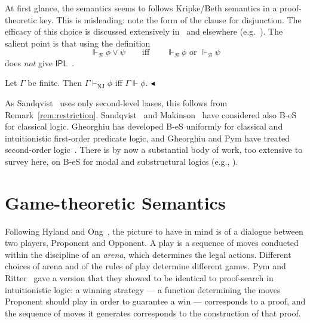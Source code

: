 \documentclass{lipics-v2021}
\newcommand{\fillBox}{\hfill$\blacktriangleleft$}
\newcommand{\supp}[1]{\Vdash_{#1}}
\newcommand{\base}[1]{\mathcal{#1}}                    %
\newcommand{\NJ}{\mathrm{NJ}}
\newcommand{\IPL}{\textsf{IPL}}
\begin{document}
At first glance, the semantics seems to follows  Kripke/Beth semantics in a proof-theoretic key. This is misleading: note the form of the clause for disjunction. The efficacy of this choice is discussed extensively in~\cite{Sandqvist_Tor} and elsewhere (e.g.~\cite{GPRR-ContCompPtS2026}). The salient point is that using the definition \,
\[
\supp{\base{B}} \phi \lor \psi \qquad \mbox{iff} \qquad \supp{\base{B}} \phi \text{ or } \supp{\base{B}} \psi
\]
does \emph{not} give $\IPL$~\cite{Piecha2015failure,Piecha2016completeness,Piecha2019incompleteness,Stafford2026-STALOP-5}. 
 
\begin{theorem}
\label{thm:sandqvist-soundness-completeness}
Let $\Gamma$ be finite. Then $\Gamma \vdash_{\NJ} \phi$ iff $\Gamma \Vdash \phi$. \fillBox
\end{theorem}

As Sandqvist~\cite{Sandqvist_Tor} uses only second-level bases, this follows from  Remark~\ref{rem:restriction}.  Sandqvist~\cite{Sandqvist2005inferentialist} and Makinson~\cite{makinson2014inferential} have considered also B-eS for classical logic.  Gheorghiu \cite{Gheorghiu2025-FirstOrder} has developed B-eS uniformly for classical and intuitionistic first-order predicate logic, and Gheorghiu and Pym have treated second-order logic~\cite{GP2025-P-tS-S-oL}. There is by now a substantial body of work, too extensive to survey here, on B-eS for modal and substructural logics (e.g., \cite{BuzokuPym-Modal2026,EckhardtPym2025Modal,EckhardtPym2025S5,GheorghiuGuPym2023IMLL,BI-P-tS2025,buzoku2026ILL}).

\section{Game-theoretic Semantics}
\label{sec:games}
Following Hyland and Ong~\cite{HYLAND2000285}, the picture to have in mind is of a dialogue between two players, Proponent and Opponent. A play is a sequence of moves conducted within the discipline of an \emph{arena}, which determines the legal actions. Different choices of arena and of the rules of play determine different games. Pym and Ritter~\cite{Pym_ReductiveLogic} gave a version that they showed to be identical to proof-search in intuitionistic logic: a winning strategy --- a function determining the moves Proponent should play in order to guarantee a win --- corresponds to a proof, and the sequence of moves it generates corresponds to the construction of that proof.
 
\end{document}
